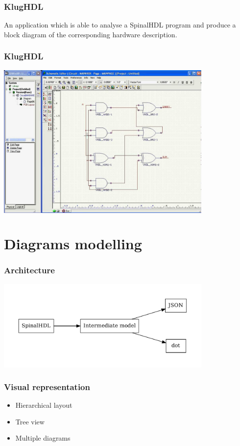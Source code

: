 \documentclass[11pt, handout]{beamer}
\begin{document}
\begin{frame}
  \frametitle{KlugHDL}
  \begin{tcolorbox}
  An application which is able to analyse a SpinalHDL program and produce a
  block diagram of the corresponding hardware description.
  \end{tcolorbox}
\end{frame}

\begin{frame}
  \frametitle{KlugHDL}
  \begin{center}
  \includegraphics[width=0.8\textwidth]{vhdl_diagram_example}
  \end{center}
\end{frame}

\section{Diagrams modelling}

\begin{frame}
  \frametitle{Architecture}
  \begin{center}
    \includegraphics[width=0.8\textwidth]{architecture}
  \end{center}
\end{frame}

\begin{frame}
  \frametitle{Visual representation}
  \begin{itemize}
  \item Hierarchical layout
  \item Tree view
  \item Multiple diagrams
  \end{itemize}
\end{frame}
\end{document}
